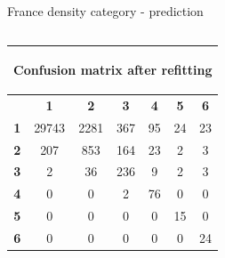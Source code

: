 \documentclass[c]{beamer}
\begin{document}
\begin{frame}
\begin{columns}
\begin{column}{0.5\textwidth}
\begin{overlayarea}{\linewidth}{4cm}
  \end{overlayarea}
  \begin{overlayarea}{\linewidth}{0.5cm}
    \centering
    \tiny France density category - prediction\par
  \end{overlayarea}
 \end{column}
\end{columns}

\begin{columns}
\begin{column}{0.6\textwidth}
  \begin{table}
  \begin{center}
  \begin{adjustbox}{max width=0.6\textwidth}
  {\tiny
  \begin{tabular}{|c|c|c|c|c|c|c|}
    \hline
    \multicolumn{7}{|c|}{{\tiny \begin{bf}Confusion matrix after refitting\end{bf}}} \\
    \hline
     & \textbf{1} & \textbf{2} & \textbf{3} & \textbf{4} & \textbf{5} & \textbf{6}\\
    \hline
    \textbf{1} & 29743 & 2281 & 367 & 95 & 24 & 23\\
    \hline
    \textbf{2} & 207 & 853 & 164 & 23 & 2 & 3\\
    \hline
    \textbf{3} & 2 & 36 & 236 & 9 & 2 & 3\\
    \hline
    \textbf{4} & 0 & 0 & 2 & 76 & 0 & 0\\
    \hline
    \textbf{5} & 0 & 0 & 0 & 0 & 15 & 0\\
    \hline
    \textbf{6} & 0 & 0 & 0 & 0 & 0 & 24\\
    \hline
  \end{tabular}
  }
  \end{adjustbox}
  \end{center}
  \end{table}
\end{column}
\begin{column}{0.6\textwidth}

\end{column}
\end{columns}
\end{frame}
\end{document}

